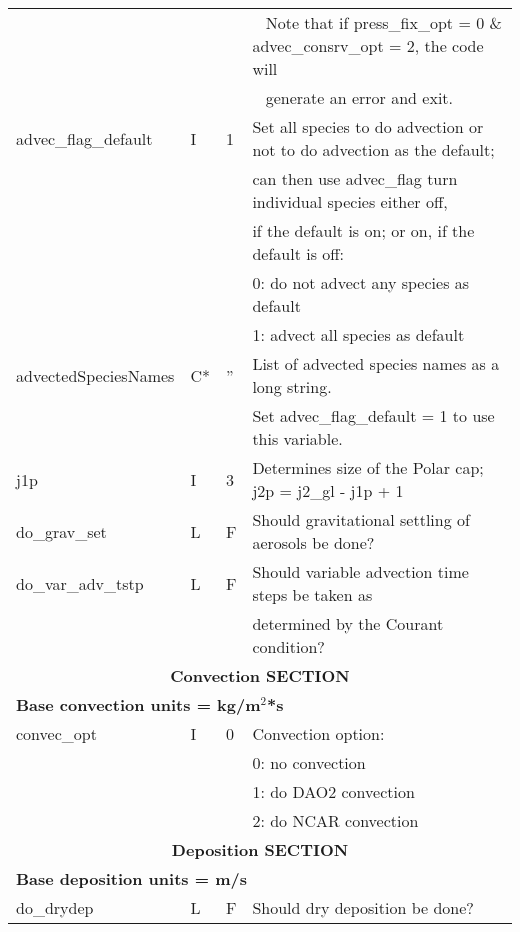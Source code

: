 {\begin{landscape}
\begin{center}
\begin{longtable}{|l|l|l|l|}
                     &   &   & \mbox{  } Note that if press\_fix\_opt = 0 \& advec\_consrv\_opt = 2, the code will   \\
                     &   &   & \mbox{  } generate an error and exit.   \\ \hline
advec\_flag\_default & I & 1 & Set all species to do advection or not to  do advection as the default; \\
                     &   &   & can then use advec\_flag turn individual species either off,    \\
                     &   &   & if the default is on; or on, if the default is off:   \\
                     &   &   &      0:  do not advect any species as default   \\
                     &   &   &      1:  advect all species        as default  \\ \hline
advectedSpeciesNames & C*& '' & List of advected species names as a long string. \\
                     &   &    & Set advec\_flag\_default = 1 to use this variable. \\ \hline
j1p                  & I & 3  & Determines size of the Polar cap; j2p = j2\_gl - j1p + 1  \\ \hline
do\_grav\_set        & L & F & Should gravitational settling of aerosols be done?  \\ \hline
do\_var\_adv\_tstp   & L & F & Should variable advection time steps be taken as  \\
                     &   &   & determined by the Courant condition?  \\ \hline \hline
%
%
\multicolumn{4}{|c|}{\bf Convection SECTION} \\ \hline \hline
\multicolumn{4}{|l|}{\bf Base convection units = kg/m$^2$*s} \\ \hline
convec\_opt      & I & 0 & Convection option:   \\
                 &   &   &         0:  no convection   \\
                 &   &   &         1:  do DAO2 convection   \\
                 &   &   &         2:  do NCAR convection  \\ \hline\hline
%
%
\multicolumn{4}{|c|}{\bf Deposition SECTION} \\ \hline\hline
\multicolumn{4}{|l|}{\bf Base deposition units = m/s} \\ \hline
do\_drydep       & L &  F  & Should dry deposition be done?  \\ \hline

\end{longtable}
\end{center}
\end{landscape}}
